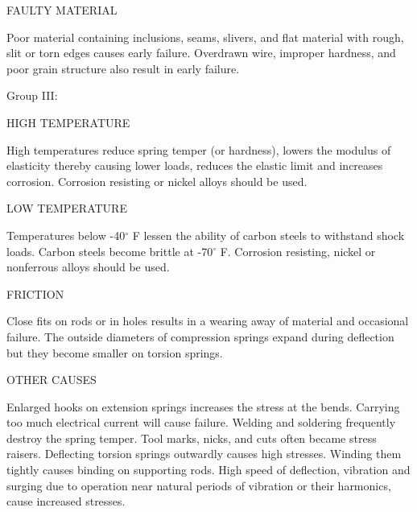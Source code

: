 \documentclass[10pt]{article}
\begin{document}
FAULTY MATERIAL

Poor material containing inclusions, seams, slivers, and flat material with rough, slit or torn edges causes early failure.
Overdrawn wire, improper hardness, and poor grain structure also result in early failure.

Group III:

HIGH TEMPERATURE

High temperatures reduce spring temper (or hardness), lowers the modulus of elasticity thereby causing lower loads, reduces the elastic limit and increases corrosion. 
Corrosion resisting or nickel alloys should be used.

LOW TEMPERATURE

Temperatures below -40$^{\circ}$ F lessen the ability of carbon steels to withstand shock loads. Carbon steels become brittle at -70$^{\circ}$ F. 
Corrosion resisting, nickel or nonferrous alloys should be used.

FRICTION

Close fits on rods or in holes results in a wearing away of material and occasional failure.
The outside diameters of compression springs expand during deflection but they become smaller on torsion springs.

OTHER CAUSES

Enlarged hooks on extension springs increases the stress at the bends. 
Carrying too much electrical current will cause failure. 
Welding and soldering frequently destroy the spring temper. 
Tool marks, nicks, and cuts often became stress raisers. 
Deflecting torsion springs outwardly causes high stresses. 
Winding them tightly causes binding on supporting rods. 
High speed of deflection, vibration and surging due to operation near natural periods of vibration or their harmonics, cause increased stresses.
\end{document}
